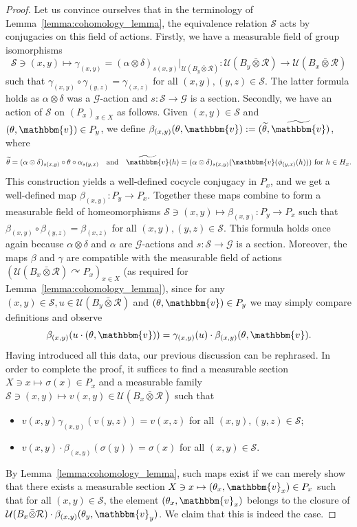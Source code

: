 \documentclass[11pt,a4paper]{article}
\theoremstyle{definition}
\theoremstyle{remark}
\numberwithin{equation}{section}
\numberwithin{theorem}{section}
\renewcommand{\tilde}{\widetilde}
\newcommand{\acts}{\curvearrowright}
\begin{document}
\begin{proof}
Let us convince ourselves that in the terminology of Lemma~\ref{lemma:cohomology_lemma}, the equivalence relation $\mathcal{S}$ acts by conjugacies on this field of actions.
Firstly, we have a measurable field of group isomorphisms 
\[
{\mathcal{S} \ni (x,y) \mapsto  \gamma_{(x,y)} = (\alpha \otimes \delta)_{s(x,y)}|_{\mathcal{U}(B_y \bar{\otimes} \mathcal{R})} \colon \mathcal{U}(B_y \bar{\otimes} \mathcal{R})\rightarrow \mathcal{U}(B_x \bar{\otimes} \mathcal{R})}
\]
such that $\gamma_{(x,y)} \circ \gamma_{(y,z)} = \gamma_{(x,z)}$ for all $(x,y), (y,z) \in \mathcal{S}$.
The latter formula holds as $\alpha\otimes\delta$ was a $\mathcal G$-action and $s: \mathcal{S}\to\mathcal{G}$ is a section.
Secondly, we have an action of $\mathcal{S}$ on $(P_x)_{x \in X}$ as follows.
Given $(x,y) \in \mathcal{S}$ and $(\theta, \mathbbm{v}) \in P_y$, we define $\beta_{(x,y)}(\theta, \mathbbm{v}) := (\tilde{\theta}, \tilde{\mathbbm{v}})$, where
\[
\tilde{\theta} = (\alpha \otimes \delta)_{s(x,y)} \circ \theta \circ \alpha_{s(y,x)} \quad\text{and}\quad
\tilde{\mathbbm{v}}(h) = (\alpha \otimes \delta)_{s(x,y)}(\mathbbm{v}({\phi_{(y,x)}(h)})) \text{ for } h \in H_x.
\]
This construction yields a well-defined cocycle conjugacy in $P_x$, and we get a well-defined map $\beta_{(x,y)}\colon P_y \rightarrow P_x$.
Together these maps combine to form a measurable field of homeomorphisms $\mathcal{S} \ni (x,y) \mapsto \beta_{(x,y)}\colon P_y \to P_x$ such that $\beta_{(x,y)} \circ \beta_{(y,z)} = \beta_{(x,z)}$ for all $(x,y), (y,z) \in \mathcal{S}$. 
This formula holds once again because $\alpha\otimes\delta$ and $\alpha$ are $\mathcal G$-actions and $s\colon \mathcal{S}\to\mathcal{G}$ is a section.
Moreover, the maps $\beta$ and $\gamma$ are compatible with the measurable field of actions ${(\mathcal{U}(B_x \bar{\otimes} \mathcal{R}) \acts P_x)_{x \in X}}$ (as required for Lemma~\ref{lemma:cohomology_lemma}), since for any $(x,y) \in \mathcal{S}, u \in \mathcal{U}(B_y \bar{\otimes} \mathcal{R})$ and $(\theta,\mathbbm{v}) \in P_y$ we may simply compare definitions and observe
\[
\beta_{(x,y)}(u \cdot (\theta,\mathbbm{v})) = \gamma_{(x,y)}(u) \cdot \beta_{(x,y)}(\theta,\mathbbm{v}).
\]
Having introduced all this data, our previous discussion can be rephrased. 
In order to complete the proof, it suffices to find a measurable section $X \ni x \mapsto \sigma(x) \in P_x$ and a measurable family $\mathcal{S} \ni (x,y) \mapsto v(x,y) \in \mathcal{U}(B_x \bar{\otimes} \mathcal{R})$ such that
\begin{itemize}
\item $v(x,y) \gamma_{(x,y)}(v(y,z)) = v(x,z)$ for all $(x,y), (y,z) \in \mathcal{S}$;
\item $v(x,y) \cdot \beta_{(x,y)}(\sigma(y)) = \sigma(x)$ for all $(x,y) \in \mathcal{S}$.
\end{itemize}
By Lemma~\ref{lemma:cohomology_lemma}, such maps exist if we can merely show that
there exists a measurable section $X \ni x \mapsto (\theta_x, \mathbbm{v}_x) \in P_x$ such that for all $(x,y) \in \mathcal{S}$, the element $(\theta_x, \mathbbm{v}_x)$ belongs to the closure of $\mathcal{U}(B_x \bar{\otimes}\mathcal{R}) \cdot \beta_{(x,y)}(\theta_y,\mathbbm{v}_y)$.
We claim that this is indeed the case.


\end{proof}
\end{document}
